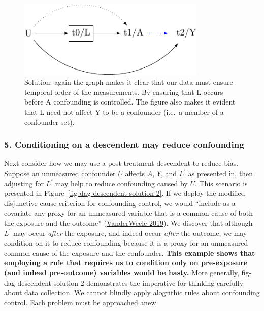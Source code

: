 \documentclass[
  singlecolumn]{article}
\begin{document}
\begin{figure}

{\centering \includegraphics[width=0.8\textwidth,height=\textheight]{causal-dags_files/figure-pdf/fig-dag-descendent-solution-1.pdf}

}

\caption{\label{fig-dag-descendent-solution}Solution: again the graph
makes it clear that our data must ensure temporal order of the
measurements. By ensuring that L occurs before A confounding is
controlled. The figure also makes it evident that L need not affect Y to
be a confounder (i.e.~a member of a confounder set).}

\end{figure}

\hypertarget{conditioning-on-a-descendent-may-reduce-confounding}{%
\subsubsection{5. Conditioning on a descendent may reduce
confounding}\label{conditioning-on-a-descendent-may-reduce-confounding}}

Next consider how we may use a post-treatment descendent to reduce bias.
Suppose an unmeasured confounder \(U\) affects \(A\), \(Y\), and
\(L^\prime\) as presented in, then adjusting for \(L^\prime\) may help
to reduce confounding caused by \(U\). This scenario is presented in
Figure~\ref{fig-dag-descendent-solution-2}. If we deploy the modified
disjunctive cause criterion for confounding control, we would ``include
as a covariate any proxy for an unmeasured variable that is a common
cause of both the exposure and the outcome''
(\protect\hyperlink{ref-vanderweele2019}{VanderWeele 2019}). We discover
that although \(L^\prime\) may occur \emph{after} the exposure, and
indeed occur \emph{after} the outcome, we may condition on it to reduce
confounding because it is a proxy for an unmeasured common cause of the
exposure and the confounder. \textbf{This example shows that employing a
rule that requires us to condition only on pre-exposure (and indeed
pre-outcome) variables would be hasty.} More generally,
fig-dag-descendent-solution-2 demonstrates the imperative for thinking
carefully about data collection. We cannot blindly apply alogrithic
rules about confounding control. Each problem must be approached anew.
\end{document}
